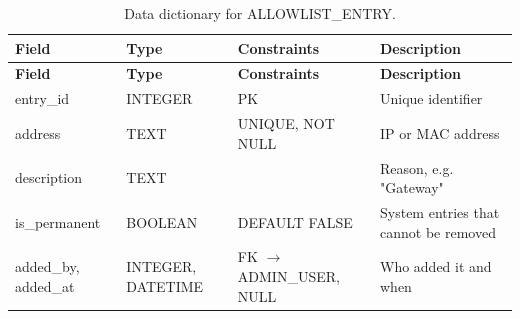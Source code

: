 {\small
\begin{longtable}{|>{\raggedright\arraybackslash}p{}|>{\raggedright\arraybackslash}p{}|>{\raggedright\arraybackslash}p{}|>{\raggedright\arraybackslash}p{}|}
\caption{Data dictionary for ALLOWLIST\_ENTRY.}\label{tab:4.23}\\
\hline
\textbf{Field} & \textbf{Type} & \textbf{Constraints} & \textbf{Description} \\ \hline
\endfirsthead
\hline
\textbf{Field} & \textbf{Type} & \textbf{Constraints} & \textbf{Description} \\ \hline
\endhead
entry\_id & INTEGER & PK & Unique identifier \\ \hline
address & TEXT & UNIQUE, NOT NULL & IP or MAC address \\ \hline
description & TEXT &  & Reason, e.g. "Gateway" \\ \hline
is\_permanent & BOOLEAN & DEFAULT FALSE & System entries that cannot be removed \\ \hline
added\_by, added\_at & INTEGER, DATETIME & FK $\rightarrow$ ADMIN\_USER, NULL & Who added it and when \\ \hline
\end{longtable}
}

